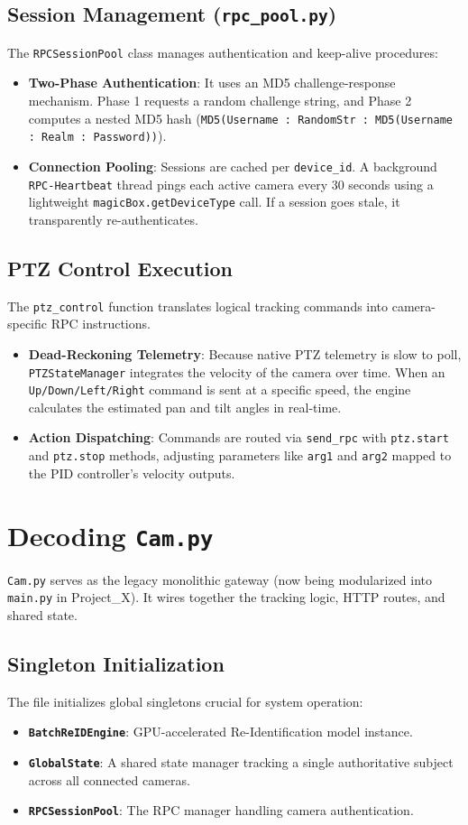 \documentclass[12pt,a4paper]{article}
\begin{document}
\subsection{Session Management (\texttt{rpc\_pool.py})}
The \texttt{RPCSessionPool} class manages authentication and keep-alive procedures:
\begin{itemize}
    \item \textbf{Two-Phase Authentication}: It uses an MD5 challenge-response mechanism. Phase 1 requests a random challenge string, and Phase 2 computes a nested MD5 hash (\texttt{MD5(Username : RandomStr : MD5(Username : Realm : Password))}).
    \item \textbf{Connection Pooling}: Sessions are cached per \texttt{device\_id}. A background \texttt{RPC-Heartbeat} thread pings each active camera every 30 seconds using a lightweight \texttt{magicBox.getDeviceType} call. If a session goes stale, it transparently re-authenticates.
\end{itemize}

\subsection{PTZ Control Execution}
The \texttt{ptz\_control} function translates logical tracking commands into camera-specific RPC instructions.
\begin{itemize}
    \item \textbf{Dead-Reckoning Telemetry}: Because native PTZ telemetry is slow to poll, \texttt{PTZStateManager} integrates the velocity of the camera over time. When an \texttt{Up/Down/Left/Right} command is sent at a specific speed, the engine calculates the estimated pan and tilt angles in real-time.
    \item \textbf{Action Dispatching}: Commands are routed via \texttt{send\_rpc} with \texttt{ptz.start} and \texttt{ptz.stop} methods, adjusting parameters like \texttt{arg1} and \texttt{arg2} mapped to the PID controller's velocity outputs.
\end{itemize}

\section{Decoding \texttt{Cam.py}}
\texttt{Cam.py} serves as the legacy monolithic gateway (now being modularized into \texttt{main.py} in Project\_X). It wires together the tracking logic, HTTP routes, and shared state.
\subsection{Singleton Initialization}
The file initializes global singletons crucial for system operation:
\begin{itemize}
    \item \textbf{\texttt{BatchReIDEngine}}: GPU-accelerated Re-Identification model instance.
    \item \textbf{\texttt{GlobalState}}: A shared state manager tracking a single authoritative subject across all connected cameras.
    \item \textbf{\texttt{RPCSessionPool}}: The RPC manager handling camera authentication.
\end{itemize}
\end{document}
